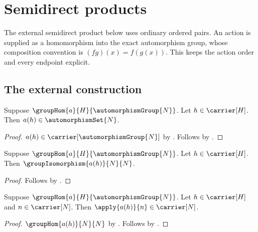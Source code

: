 




\section{Semidirect products}

The external semidirect product below uses ordinary ordered pairs.  An action
is supplied as a homomorphism into the exact automorphism group, whose
composition convention is \((fg)(x)=f(g(x))\).  This keeps the action order
and every endpoint explicit.

\subsection{The external construction}

\begin{proposition}\label{semidirect_action_value_automorphism}
    Suppose
        $\groupHom{a}{H}{\automorphismGroup{N}}$.
    Let $h\in\carrier[H]$.
    Then $a(h)\in\automorphismSet{N}$.
\end{proposition}
\begin{proof}
    $a(h)\in\carrier[\automorphismGroup{N}]$ by
        .
    Follows by .
\end{proof}

\begin{corollary}\label{semidirect_action_value_isomorphism}
    Suppose $\groupHom{a}{H}{\automorphismGroup{N}}$.
    Let $h\in\carrier[H]$.
    Then $\groupIsomorphism{a(h)}{N}{N}$.
\end{corollary}
\begin{proof}
    Follows by
        .
\end{proof}

\begin{corollary}\label{semidirect_action_value_type}
    Suppose $\groupHom{a}{H}{\automorphismGroup{N}}$.
    Let $h\in\carrier[H]$ and $n\in\carrier[N]$.
    Then $\apply{a(h)}{n}\in\carrier[N]$.
\end{corollary}
\begin{proof}
    $\groupHom{a(h)}{N}{N}$ by
        .
    Follows by .
\end{proof}

